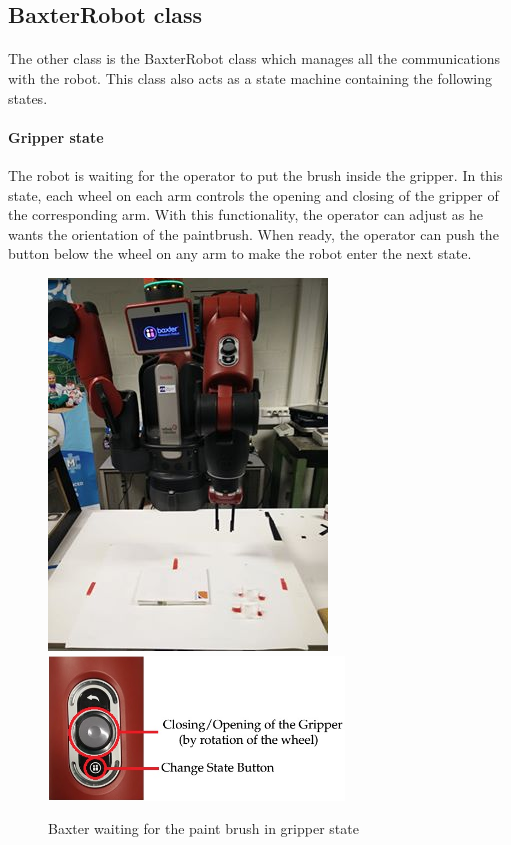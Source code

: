 \subsection{BaxterRobot class}
\paragraph{}The other class is the BaxterRobot class which manages all the communications with the robot. This class also acts as a state machine containing the following states.

\paragraph{Gripper state}The robot is waiting for the operator to put the brush inside the gripper. In this state, each wheel on each arm controls the opening and closing of the gripper of the corresponding arm. With this functionality, the operator can adjust as he wants the orientation of the paintbrush. When ready, the operator can push the button below the wheel on any arm to make the robot enter the next state.

\begin{figure}[!ht]
	\centering
	\includegraphics[scale = 0.38]{report/Images/WaitingBrush.jpg}
    \includegraphics[width = 0.7\textwidth]{report/Images/ArmButtons.jpg}
    \caption{Baxter waiting for the paint brush in gripper state}
    \label{fig:buttons}
\end{figure}

